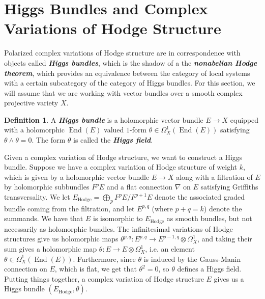 \documentclass[psamsfonts, 12pt]{amsart}
\theoremstyle{definition}
\newtheorem{defn}[thm]{Definition}
\theoremstyle{remark}
\newcommand{\ib}[1]{\textbf{\textit{#1}}}
\DeclareMathOperator{\End}{End}
\begin{document}
\section{Higgs Bundles and Complex Variations of Hodge Structure}
%
Polarized complex variations of Hodge structure are in correspondence with objects
called \ib{Higgs bundles}, which is the shadow of a the
\ib{nonabelian Hodge theorem}\cite{SimpsonHiggsBundles},
which provides an equivalence between the category of local systems with a certain
subcategory of the category of Higgs bundles. For this section, we
will assume that we are working with vector bundles over a smooth complex
projective variety $X$.
%
\begin{defn}
A \ib{Higgs bundle} is a holomorphic vector bundle $E \to X$ equipped with
a holomorphic $\End(E)$ valued $1$-form $\theta \in \Omega^1_X(\End(E))$
satisfying $\theta \wedge \theta = 0$. The form $\theta$ is called
the \ib{Higgs field}.
\end{defn}
%
Given a complex variation of Hodge structure, we want to construct a Higgs bundle.
Suppose we have a complex variation of Hodge structure of weight $k$, which is given
by a holomorphic vector bundle $E \to X$ along with a filtration of $E$
by holomorphic subbundles $F^pE$ and a flat connection $\nabla$ on $E$
satisfying Griffiths transversality. We let
$E_{\mathrm{Hodge}} = \bigoplus_p F^pE/F^{p+1}E$ denote
the associated graded bundle coming from the filtration, and let $E^{p,q}$
(where $p+q = k$) denote the summands. We have that $E$ is isomorphic to
$E_{\mathrm{Hodge}}$ as smooth bundles, but not necessarily as holomorphic
bundles. The infinitesimal variations of Hodge structures give us holomorphic
maps $\theta^{p,q} : E^{p,q} \to E^{p-1,q}\otimes \Omega^1_X$,
and taking their sum gives a holomorphic map $\theta : E \to E \otimes \Omega^1_X$,
i.e. an element $\theta \in \Omega^1_X(\End(E))$. Furthermore, since $\theta$
is induced by the Gauss-Manin connection on $E$, which is flat, we get
that $\theta^2 = 0$, so $\theta$ defines a Higgs field. Putting things together,
a complex variation of Hodge structure $E$ gives us a Higgs bundle
$(E_{\mathrm{Hodge}}, \theta)$. \\
\end{document}
